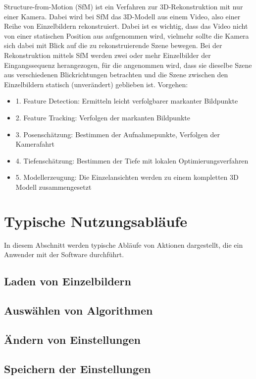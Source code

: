 Structure-from-Motion (SfM) ist ein Verfahren zur 3D-Rekonstruktion mit nur einer Kamera. Dabei wird bei SfM das 3D-Modell aus einem Video, also einer Reihe von Einzelbildern rekonstruiert. Dabei ist es wichtig, dass das Video nicht von einer statischen Position aus aufgenommen wird, vielmehr sollte die Kamera sich dabei mit Blick auf die zu rekonstruierende Szene bewegen. Bei der Rekonstruktion mittels SfM werden zwei oder mehr Einzelbilder der Eingangssequenz herangezogen, für die angenommen wird, dass sie dieselbe Szene aus verschiedenen Blickrichtungen betrachten und die Szene zwischen den Einzelbildern statisch (unverändert) geblieben ist.
Vorgehen:
\begin{itemize}
\item 1. Feature Detection: Ermitteln leicht verfolgbarer markanter Bildpunkte\item 2. Feature Tracking: Verfolgen der markanten Bildpunkte\item 3. Posenschätzung: Bestimmen der Aufnahmepunkte, Verfolgen der Kamerafahrt\item 4. Tiefenschätzung: Bestimmen der Tiefe mit lokalen Optimierungsverfahren\item 5. Modellerzeugung: Die Einzelansichten werden zu einem kompletten 3D Modell zusammengesetzt
\end{itemize}

\section{Typische Nutzungsabläufe}
\label{ch:usecases}
In diesem Abschnitt werden typische Abläufe von Aktionen dargestellt, die ein Anwender mit der Software durchführt.
\subsection{Laden von Einzelbildern}
\label{usecase:1}
\subsection{Auswählen von Algorithmen}
\label{usecase:2}
\subsection{Ändern von Einstellungen}
\label{usecase:3}
\subsection{Speichern der Einstellungen}
\label{usecase:4}
